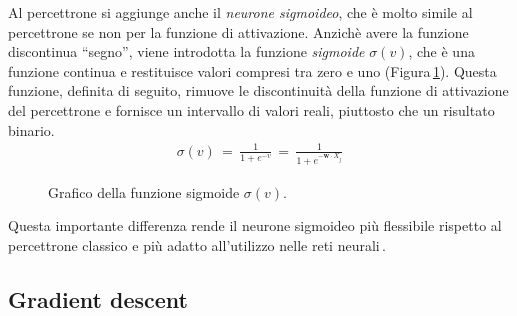 Al percettrone si aggiunge anche il \textsl{neurone sigmoideo}, che è molto simile al percettrone se non per la funzione di attivazione. Anzichè avere la funzione discontinua ``segno'', viene introdotta la funzione \textsl{sigmoide} $\sigma(v)$, che è una funzione continua e restituisce valori compresi tra zero e uno (Figura\,\ref{fig:sigmoid-function}). Questa funzione, definita di seguito, rimuove le discontinuità della funzione di attivazione del percettrone e fornisce un intervallo di valori reali, piuttosto che un risultato binario.
% 
\begin{gather*}
    \sigma(v) \, = \, \frac{1}{1 + e^{-v}} \, = \, \frac{1}{1 + e^{-\mathbf{w} \cdot X_j}}
\end{gather*}
% 
\begin{figure}[!t]
    \centering
    
    \caption[Grafico della funzione sigmoide $\sigma(v)$.]{Grafico della funzione sigmoide $\sigma(v)$.}\label{fig:sigmoid-function}
\end{figure}
% 
Questa importante differenza rende il neurone sigmoideo più flessibile rispetto al percettrone classico e più adatto all'utilizzo nelle reti neurali\,\cite{nielsen2015neural}.

\subsection{Gradient descent}

